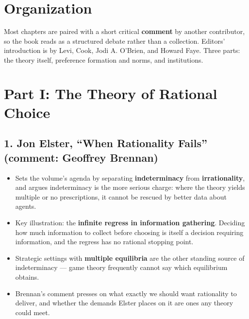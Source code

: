 \documentclass[12pt]{article}
\begin{document}
\section{Organization}

Most chapters are paired with a short critical \textbf{comment} by another
contributor, so the book reads as a structured debate rather than a
collection. Editors' introduction is by Levi, Cook, Jodi A. O'Brien, and
Howard Faye. Three parts: the theory itself, preference formation and norms,
and institutions.

\section{Part I: The Theory of Rational Choice}

\subsection*{1. Jon Elster, ``When Rationality Fails'' (comment: Geoffrey Brennan)}
\begin{itemize}[leftmargin=*, itemsep=3pt]
    \item Sets the volume's agenda by separating \textbf{indeterminacy} from
    \textbf{irrationality}, and argues indeterminacy is the more serious
    charge: where the theory yields multiple or no prescriptions, it cannot be
    rescued by better data about agents.
    \item Key illustration: the \textbf{infinite regress in information
    gathering}. Deciding how much information to collect before choosing is
    itself a decision requiring information, and the regress has no rational
    stopping point.
    \item Strategic settings with \textbf{multiple equilibria} are the other
    standing source of indeterminacy --- game theory frequently cannot say
    which equilibrium obtains.
    \item Brennan's comment presses on what exactly we should want rationality
    to deliver, and whether the demands Elster places on it are ones any
    theory could meet.
\end{itemize}
\end{document}
